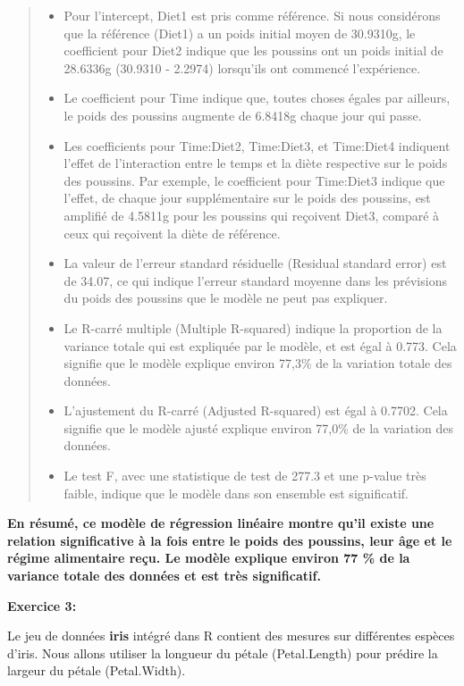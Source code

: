 \documentclass[
]{article}
\providecommand{\tightlist}{%
  \setlength{\itemsep}{0pt}\setlength{\parskip}{0pt}}
\begin{document}
\begin{quote}
\begin{itemize}
\tightlist
\item
  Pour l'intercept, Diet1 est pris comme référence. Si nous considérons que la référence (Diet1) a un poids initial moyen de 30.9310g, le coefficient pour Diet2 indique que les poussins ont un poids initial de 28.6336g (30.9310 - 2.2974) lorsqu'ils ont commencé l'expérience.
\item
  Le coefficient pour Time indique que, toutes choses égales par ailleurs, le poids des poussins augmente de 6.8418g chaque jour qui passe.
\item
  Les coefficients pour Time:Diet2, Time:Diet3, et Time:Diet4 indiquent l'effet de l'interaction entre le temps et la diète respective sur le poids des poussins. Par exemple, le coefficient pour Time:Diet3 indique que l'effet, de chaque jour supplémentaire sur le poids des poussins, est amplifié de 4.5811g pour les poussins qui reçoivent Diet3, comparé à ceux qui reçoivent la diète de référence.
\item
  La valeur de l'erreur standard résiduelle (Residual standard error) est de 34.07, ce qui indique l'erreur standard moyenne dans les prévisions du poids des poussins que le modèle ne peut pas expliquer.
\item
  Le R-carré multiple (Multiple R-squared) indique la proportion de la variance totale qui est expliquée par le modèle, et est égal à 0.773. Cela signifie que le modèle explique environ 77,3\% de la variation totale des données.
\item
  L'ajustement du R-carré (Adjusted R-squared) est égal à 0.7702. Cela signifie que le modèle ajusté explique environ 77,0\% de la variation des données.
\item
  Le test F, avec une statistique de test de 277.3 et une p-value très faible, indique que le modèle dans son ensemble est significatif.
\end{itemize}
\end{quote}

\textbf{En résumé, ce modèle de régression linéaire montre qu'il existe une relation significative à la fois entre le poids des poussins, leur âge et le régime alimentaire reçu. Le modèle explique environ 77 \% de la variance totale des données et est très significatif.}

\textbf{Exercice 3:}

Le jeu de données \textbf{iris} intégré dans R contient des mesures sur différentes espèces d'iris. Nous allons utiliser la longueur du pétale (Petal.Length) pour prédire la largeur du pétale (Petal.Width).
\end{document}
